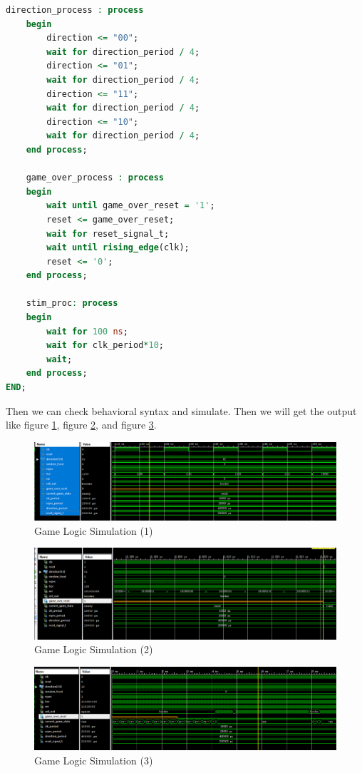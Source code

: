\documentclass{article}
\begin{document}
\begin{lstlisting}[language=VHDL,caption=Game Logic Unit Test Bench]
    direction_process : process
    begin
        direction <= "00";
        wait for direction_period / 4;
        direction <= "01";
        wait for direction_period / 4;
        direction <= "11";
        wait for direction_period / 4;
        direction <= "10";
        wait for direction_period / 4;
    end process;
    
    game_over_process : process
    begin
        wait until game_over_reset = '1';
        reset <= game_over_reset;
        wait for reset_signal_t;
        wait until rising_edge(clk);
        reset <= '0';
    end process;
    
    stim_proc: process
    begin		
        wait for 100 ns;	
        wait for clk_period*10;
        wait;
    end process;
END;
    \end{lstlisting}
    
    Then we can check behavioral syntax and simulate. Then we will get the output like 
    figure \ref{fig:homework3-7}, figure \ref{fig:homework3-8}, and figure \ref{fig:homework3-9}.
    
    \begin{figure}[h]
\centering
\includegraphics[width=1\linewidth]{homework3-7}
\caption{Game Logic Simulation (1)}
\label{fig:homework3-7}
\end{figure}
\begin{figure}[h]
\centering
\includegraphics[width=1\linewidth]{homework3-8}
\caption{Game Logic Simulation (2)}
\label{fig:homework3-8}
\end{figure}
\begin{figure}[h]
\centering
\includegraphics[width=0.7\linewidth]{homework3-9}
\caption{Game Logic Simulation (3)}
\label{fig:homework3-9}
\end{figure}
\end{document}
